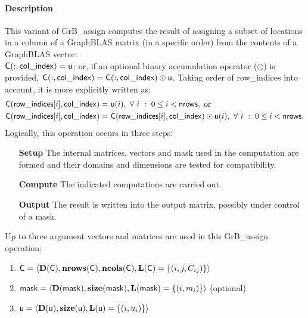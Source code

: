 \paragraph{Description}

This variant of {\sf GrB\_assign} computes the result of assigning a subset of
locations in a column of a GraphBLAS matrix (in a specific order) from the 
contents of a GraphBLAS vector: \\
${\sf C}(:,{\sf col\_index}) = {\sf u}$; or, if an 
optional binary accumulation operator ($\odot$) is provided, 
${\sf C}(:,{\sf col\_index}) = 
{\sf C}(:,{\sf col\_index}) \odot {\sf u}$. Taking order of {\sf row\_indices}
into account, it is more explicitly written as:
\[
\begin{aligned}
    {\sf C}({\sf row\_indices}[i],{\sf col\_index}) = &\ {\sf u}(i),
    \ \forall \ i \ : \ 0 \leq i < {\sf nrows}, \mbox{~or~}
    \\
    {\sf C}({\sf row\_indices}[i],{\sf col\_index}) = &\ 
    {\sf C}({\sf row\_indices}[i],{\sf col\_index}) \odot {\sf u}(i),
    \ \forall \ i \ : \ 0 \leq i < {\sf nrows}.
\end{aligned}
\]
Logically, this operation occurs in three steps:
\begin{enumerate}[leftmargin=0.75in]
\item[\bf Setup] The internal matrices, vectors and mask used in the computation are formed 
and their domains and dimensions are tested for compatibility.
\item[\bf Compute] The indicated computations are carried out.
\item[\bf Output] The result is written into the output matrix, possibly under 
control of a mask.
\end{enumerate}

Up to three argument vectors and matrices are used in this {\sf GrB\_assign} 
operation:
\begin{enumerate}
	\item ${\sf C} = \langle \bold{D}({\sf C}),\bold{nrows}({\sf C}),
    \bold{ncols}({\sf C}),\bold{L}({\sf C}) = \{(i,j,C_{ij}) \} \rangle$

	\item ${\sf mask} = \langle \bold{D}({\sf mask}),\bold{size}({\sf mask}),
    \bold{L}({\sf mask}) = \{(i,m_i) \} \rangle$ (optional)

	\item ${\sf u} = \langle \bold{D}({\sf u}),\bold{size}({\sf u}),
    \bold{L}({\sf u}) = \{(i,u_i) \} \rangle$
\end{enumerate}

